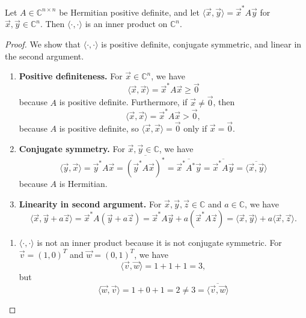 \documentclass{homework}
\begin{document}
	\question Let $A \in \mathbb{C}^{n\times n}$ be Hermitian positive definite, and let $\langle \vec{x}, \vec{y}\rangle = \vec{x}^*A\vec{y}$ for $\vec{x},\vec{y} \in \mathbb{C}^n$. Then $\langle\cdot,\cdot\rangle$ is an inner product on $\mathbb{C}^n$.
	\begin{proof}
		We show that $\langle \cdot,\cdot\rangle$ is positive definite, conjugate symmetric, and linear in the second argument.
		\begin{enumerate}
			\item \textbf{Positive definiteness.} For $\vec{x} \in \mathbb{C}^n$, we have
			\begin{equation*}
				\langle \vec{x}, \vec{x}\rangle  = \vec{x}^*A\vec{x} \ge \vec{0}
			\end{equation*}
			because $A$ is positive definite. Furthermore, if $\vec{x} \ne \vec{0}$, then
			\begin{equation*}
				\langle \vec{x}, \vec{x} \rangle =\vec{x}^*A\vec{x} > \vec{0},
			\end{equation*}
			because $A$ is positive definite, so $\langle \vec{x}, \vec{x} \rangle =\vec{0}$ only if $\vec{x} = \vec{0}$.
			
			\item \textbf{Conjugate symmetry.} For $\vec{x}, \vec{y} \in\mathbb{C}$, we have
			\begin{equation*}
				\langle \vec{y}, \vec{x}\rangle  = \vec{y}^*A\vec{x} = \overline{(\vec{y}^*A\vec{x})^*} = \overline{\vec{x}^*A^*\vec{y}} = \overline{\vec{x}^*A\vec{y}} = \overline{\langle \vec{x}, \vec{y}\rangle}
			\end{equation*}
			because $A$ is Hermitian.
			
			\item \textbf{Linearity in second argument.} For $\vec{x}, \vec{y}, \vec{z} \in \mathbb{C}$ and $a \in \mathbb{C}$, we have
			\begin{equation*}
				\langle \vec{x}, \vec{y} + a\vec{z}\rangle = \vec{x}^*A(\vec{y} + a\vec{z}) = \vec{x}^*A\vec{y} + a(\vec{x}^*A\vec{z}) = \langle \vec{x}, \vec{y}\rangle + a\langle \vec{x}, \vec{z}\rangle.
			\end{equation*}
		\end{enumerate}
		
		\question 
		\begin{enumerate}
			\item $\langle\cdot,\cdot\rangle$ is not an inner product because it is not conjugate symmetric. For $\vec{v} = (1,0)^T$ and $\vec{w} = (0,1)^T$, we have
			\begin{equation*}
				\langle\vec{v},\vec{w}\rangle = 1 + 1 + 1 = 3,
			\end{equation*}
			but
			\begin{equation*}
				\langle\vec{w},\vec{v}\rangle = 1 + 0 + 1 = 2 \ne 3 = \overline{\langle\vec{v},\vec{w} \rangle}
			\end{equation*}
			

\end{enumerate}
\end{proof}
\end{document}
